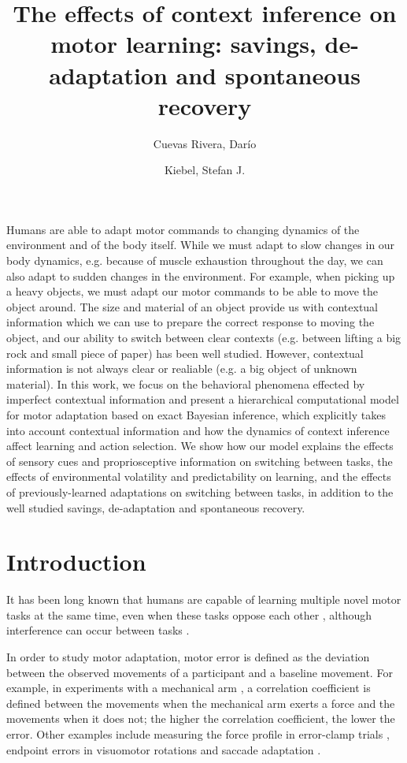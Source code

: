 \documentclass[a4paper,doc,floatsintext,natbib]{apa6}
\title{The effects of context inference on motor learning: savings, de-adaptation and spontaneous recovery}
\author[1]{Cuevas Rivera, Darío}
\author[1]{Kiebel, Stefan J.}
\affil[1]{Chair of Neuroimaging, Faculty of Psychology. Technische Universität Dresden, 01062 Dresden, Germany.}
\affiliation{~}
\begin{document}
\maketitle

Humans are able to adapt motor commands to changing dynamics of the environment and of the body itself. While we must adapt to slow changes in our body dynamics, e.g. because of muscle exhaustion throughout the day, we can also adapt to sudden changes in the environment. For example, when picking up a heavy objects, we must adapt our motor commands to be able to move the object around. The size and material of an object provide us with contextual information which we can use to prepare the correct response to moving the object, and our ability to switch between clear contexts (e.g. between lifting a big rock and small piece of paper) has been well studied. However, contextual information is not always clear or realiable (e.g. a big object of unknown material). In this work, we focus on the behavioral phenomena effected by imperfect contextual information and present a hierarchical computational model for motor adaptation based on exact Bayesian inference, which explicitly takes into account contextual information and how the dynamics of context inference affect learning and action selection. We show how our model explains the effects of sensory cues and propriosceptive information on switching between tasks, the effects of environmental volatility and predictability on learning, and the effects of previously-learned adaptations on switching between tasks, in addition to the well studied savings, de-adaptation and spontaneous recovery.

\section{Introduction}
It has been long known that humans are capable of learning multiple novel motor tasks at the same time, even when these tasks oppose each other \citep[e.g.][]{Gandolfo_Motor_1996,Shadmehr_Functional_1997}, although interference can occur between tasks \citep[e.g.][]{Brashers-Krug_Consolidation_1996,Sing_Reduction_2010}.

In order to study motor adaptation, motor error is defined as the deviation between the observed movements of a participant and a baseline movement. For example, in experiments with a mechanical arm \citep[e.g.][]{Gandolfo_Motor_1996}, a correlation coefficient is defined between the movements when the mechanical arm exerts a force and the movements when it does not; the higher the correlation coefficient, the lower the error. Other examples include measuring the force profile in error-clamp trials \citep{Smith_Interacting_2006}, endpoint errors in visuomotor rotations \citep{Kim_Neural_2015} and saccade adaptation \citep{Catz_Cerebellardependent_2008}.
\end{document}
